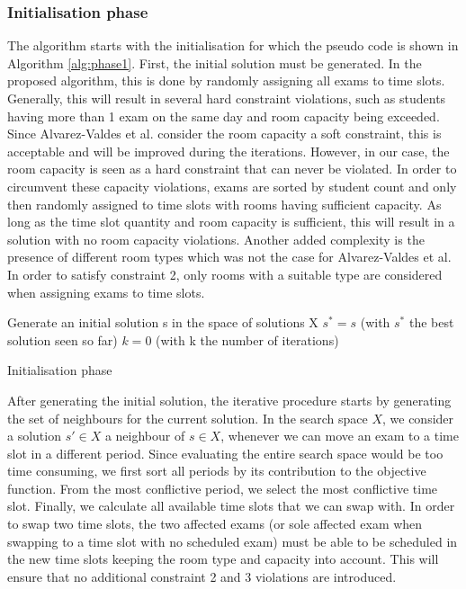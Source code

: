 \subsubsection{Initialisation phase} \label{initialisation}
The algorithm starts with the initialisation for which the pseudo code is shown in Algorithm \ref{alg:phase1}. First, the initial solution must be generated. In the proposed algorithm, this is done by randomly assigning all exams to time slots. Generally, this will result in several hard constraint violations, such as students having more than 1 exam on the same day and room capacity being exceeded. Since Alvarez-Valdes et al. consider the room capacity a soft constraint, this is acceptable and will be improved during the iterations. However, in our case, the room capacity is seen as a hard constraint that can never be violated. In order to circumvent these capacity violations, exams are sorted by student count and only then randomly assigned to time slots with rooms having sufficient capacity. As long as the time slot quantity and room capacity is sufficient, this will result in a solution with no room capacity violations. Another added complexity is the presence of different room types which was not the case for Alvarez-Valdes et al. In order to satisfy constraint 2, only rooms with a suitable type are considered when assigning exams to time slots.

\begin{algorithm}
 Generate an initial solution s in the space of solutions X\;
 $s^* = s$ (with $s^*$ the best solution seen so far)\;
 $k = 0$ (with k the number of iterations)\;

\caption{Initialisation phase}
\label{alg:phase1}
\end{algorithm}

After generating the initial solution, the iterative procedure starts by generating the set of neighbours for the current solution. In the search space $X$, we consider a solution $s' \in X$ a neighbour of $s \in X$, whenever we can move an exam to a time slot in a different period. Since evaluating the entire search space would be too time consuming, we first sort all periods by its contribution to the objective function. From the most conflictive period, we select the most conflictive time slot. Finally, we calculate all available time slots that we can swap with. In order to swap two time slots, the two affected exams (or sole affected exam when swapping to a time slot with no scheduled exam) must be able to be scheduled in the new time slots keeping the room type and capacity into account. This will ensure that no additional constraint 2 and 3 violations are introduced.

